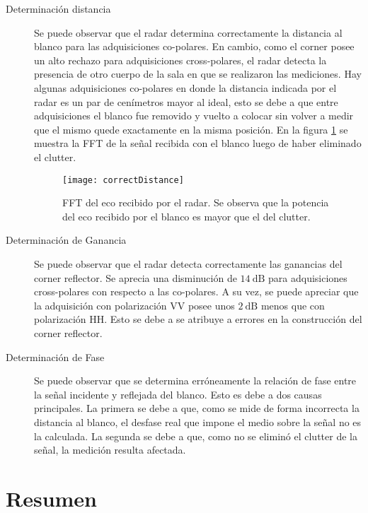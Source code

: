 \begin{description}
  \item[Determinación distancia] Se puede observar que el radar determina correctamente la distancia al blanco para las adquisiciones co-polares. En cambio, como el corner posee un alto rechazo para adquisiciones cross-polares, el radar detecta la presencia de otro cuerpo de la sala en que se realizaron las mediciones. Hay algunas adquisiciones co-polares en donde la distancia indicada por el radar es un par de cenímetros mayor al ideal, esto se debe a que entre adquisiciones el blanco fue removido y vuelto a colocar sin volver a medir que el mismo quede exactamente en la misma posición. En la figura \ref{fig:correctDistance} se muestra la FFT de la señal recibida con el blanco luego de haber eliminado el clutter.

  \begin{figure}[htb]
    \centering
    \texttt{[image: correctDistance]}
    \caption{FFT del eco recibido por el radar. Se observa que la potencia del eco recibido por el blanco es mayor que el del clutter.}
    \label{fig:correctDistance}
  \end{figure}

  \item[Determinación de Ganancia] Se puede observar que el radar detecta correctamente las ganancias del corner reflector. Se aprecia una disminución de $\SI{14}{\dB}$ para adquisiciones cross-polares con respecto a las co-polares. A su vez, se puede apreciar que la adquisición con polarización VV posee unos $\SI{2}{\dB}$ menos que con polarización HH. Esto se debe a se atribuye a errores en la construcción del corner reflector. 

  \item[Determinación de Fase] Se puede observar que se determina erróneamente la relación de fase entre la señal incidente y reflejada del blanco. Esto es debe a dos causas principales. La primera se debe a que, como se mide de forma incorrecta la distancia al blanco, el desfase real que impone el medio sobre la señal no es la calculada. La segunda se debe a que, como no se eliminó el clutter de la señal, la medición resulta afectada.
\end{description}



\section{Resumen}

